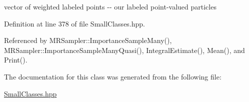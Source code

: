 vector of weighted labeled points -\/-\/ our labeled point-\/valued particles 



\-Definition at line 378 of file \-Small\-Classes.\-hpp.



\-Referenced by \-M\-R\-Sampler\-::\-Importance\-Sample\-Many(), \-M\-R\-Sampler\-::\-Importance\-Sample\-Many\-Quasi(), \-Integral\-Estimate(), \-Mean(), and \-Print().



\-The documentation for this class was generated from the following file\-:\begin{DoxyCompactItemize}
\item 
\hyperlink{SmallClasses_8hpp}{\-Small\-Classes.\-hpp}\end{DoxyCompactItemize}
